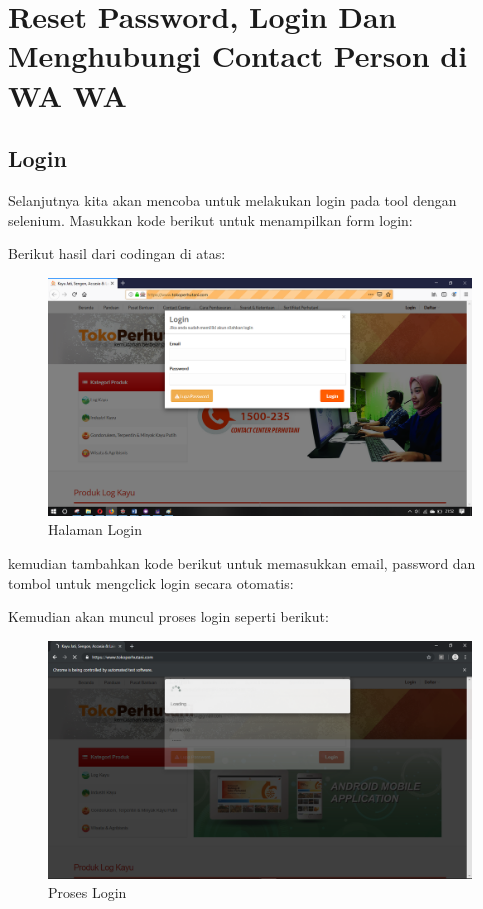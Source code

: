 \newpage
\section{Reset Password, Login Dan Menghubungi Contact Person di WA WA}
\subsection{Login}
Selanjutnya kita akan mencoba untuk melakukan login pada tool dengan selenium. 
Masukkan kode berikut untuk menampilkan form login:


Berikut hasil dari codingan di atas:
\begin{figure}[h]
	\centering
	\includegraphics[scale=0.20]{figures/0login}
	\caption{Halaman Login}
\end{figure}

kemudian tambahkan kode berikut untuk memasukkan email, password dan tombol untuk mengclick login secara otomatis: 


\newpage
Kemudian akan muncul proses login seperti berikut:
\begin{figure}[h]
	\centering
	\includegraphics[scale=0.21]{figures/1login}
	\caption{Proses Login}
\end{figure}

